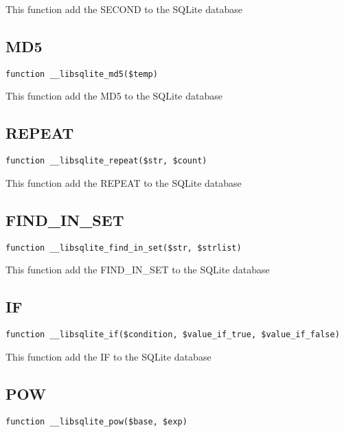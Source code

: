 \documentclass[a4paper]{book}
\begin{document}
This function add the SECOND to the SQLite database

\hypertarget{toc349}{}
\subsection{MD5}

\begin{lstlisting}
function __libsqlite_md5($temp)
\end{lstlisting}

This function add the MD5 to the SQLite database

\hypertarget{toc350}{}
\subsection{REPEAT}

\begin{lstlisting}
function __libsqlite_repeat($str, $count)
\end{lstlisting}

This function add the REPEAT to the SQLite database

\hypertarget{toc351}{}
\subsection{FIND\_IN\_SET}

\begin{lstlisting}
function __libsqlite_find_in_set($str, $strlist)
\end{lstlisting}

This function add the FIND\_IN\_SET to the SQLite database

\hypertarget{toc352}{}
\subsection{IF}

\begin{lstlisting}
function __libsqlite_if($condition, $value_if_true, $value_if_false)
\end{lstlisting}

This function add the IF to the SQLite database

\hypertarget{toc353}{}
\subsection{POW}

\begin{lstlisting}
function __libsqlite_pow($base, $exp)
\end{lstlisting}
\end{document}

